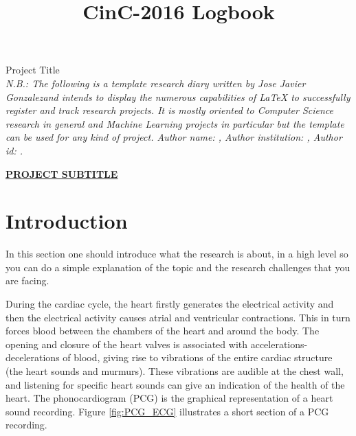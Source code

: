 \documentclass{project-logbook}
\newcommand{\userName}{Jose Javier Gonzalez}
\begin{document}
\title{CinC-2016 Logbook}
{\Huge Project Title}\\[5mm]

\textit{N.B.: The following is a template research diary written by \userName and intends to display the numerous capabilities of LaTeX to successfully register and track research projects. It is mostly oriented to Computer Science research in general and  Machine Learning projects in particular but the template can be used for any kind of project. Author name: \AuthorName, Author institution: \AuthorInstitution, Author id: \Authorid. }

\vspace{1em}
{\large \underline{\textbf{\uppercase{PROJECT SUBTITLE}}}}


\section*{Introduction} %
\label{sec:introduction}
\begin{tip}
In this section one should introduce what the research is about, in a high level so you can do a simple explanation of the topic and the research challenges that you are facing.
\end{tip}

During the cardiac cycle, the heart firstly generates the electrical activity and then the electrical activity causes atrial and ventricular contractions. This in turn forces blood between the chambers of the heart and around the body. The opening and closure of the heart valves is associated with accelerations-decelerations of blood, giving rise to vibrations of the entire cardiac structure (the heart sounds and murmurs). These vibrations are audible at the chest wall, and listening for specific heart sounds can give an indication of the health of the heart. The phonocardiogram (PCG) is the graphical representation of a heart sound recording. Figure \ref{fig:PCG_ECG} illustrates a short section of a PCG recording.
\end{document}
